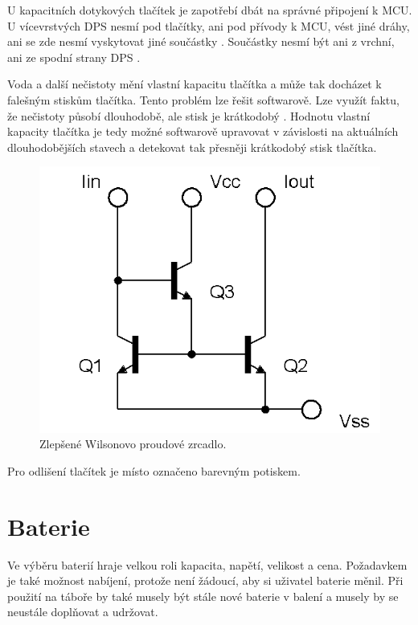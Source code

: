 
U kapacitních dotykových tlačítek je zapotřebí dbát na správné připojení k MCU. U vícevrstvých DPS nesmí pod tlačítky, ani pod přívody
k MCU, vést jiné dráhy, ani se zde nesmí vyskytovat jiné součástky \cite{PrincipKapTl}. Součástky nesmí být ani z vrchní, ani ze spodní 
strany DPS \cite{PrincipKapTl}.

Voda a další nečistoty mění vlastní kapacitu tlačítka a může tak docházet k falešným stiskům tlačítka. Tento problém lze řešit softwarově. 
Lze využít faktu, že nečistoty působí dlouhodobě, ale stisk je krátkodobý \cite{PrincipKapTl}. Hodnotu vlastní kapacity tlačítka je tedy
možné softwarově upravovat v závislosti na aktuálních dlouhodobějších stavech a detekovat tak přesněji krátkodobý stisk tlačítka. 






\begin{figure}[!h]
    \begin{center}
      \includegraphics[scale=0.5]{obrazky/ZlepseneWilsonovoZrcadloNPN}
    \end{center}
    \caption[Alenčino zrcadlo]{Zlepšené Wilsonovo proudové zrcadlo.}
  \end{figure}

Pro odlišení tlačítek je místo označeno barevným potiskem. 

\section{Baterie}
Ve výběru baterií hraje velkou roli kapacita, napětí, velikost a cena. Požadavkem je také možnost nabíjení, protože není žádoucí, aby si uživatel
baterie měnil. Při použití na táboře by také musely být stále nové baterie v balení a musely by se neustále doplňovat a udržovat.

